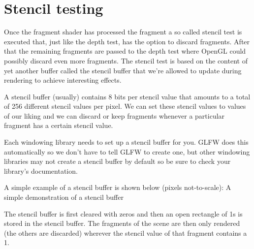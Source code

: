 \documentclass{article}
\begin{document}
\section{Stencil testing}

Once the fragment shader has processed the fragment a so called stencil test is executed that, just like the depth test, has the option to discard fragments. After that the remaining fragments are passed to the depth test where OpenGL could possibly discard even more fragments. The stencil test is based on the content of yet another buffer called the stencil buffer that we're allowed to update during rendering to achieve interesting effects.

A stencil buffer (usually) contains 8 bits per stencil value that amounts to a total of 256 different stencil values per pixel. We can set these stencil values to values of our liking and we can discard or keep fragments whenever a particular fragment has a certain stencil value.

Each windowing library needs to set up a stencil buffer for you. GLFW does this automatically so we don't have to tell GLFW to create one, but other windowing libraries may not create a stencil buffer by default so be sure to check your library's documentation.

A simple example of a stencil buffer is shown below (pixels not-to-scale):
A simple demonstration of a stencil buffer

The stencil buffer is first cleared with zeros and then an open rectangle of 1s is stored in the stencil buffer. The fragments of the scene are then only rendered (the others are discarded) wherever the stencil value of that fragment contains a 1.
\end{document}
